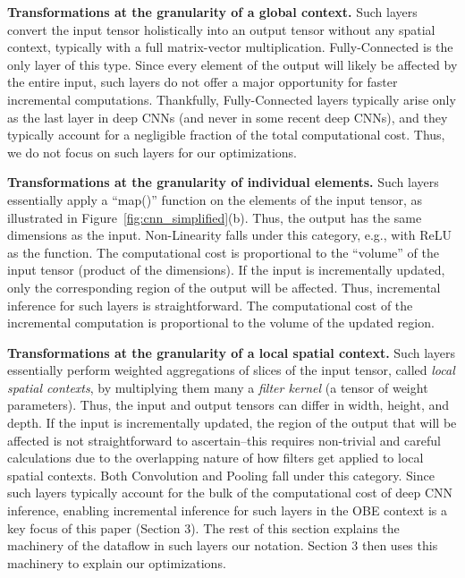 \vspace{2mm}
\noindent \textbf{Transformations at the granularity of a global context.} 
Such layers convert the input tensor holistically into an output tensor without any spatial context, typically with a full matrix-vector multiplication.
Fully-Connected is the only layer of this type. Since every element of the output will likely be affected by the entire input, such layers do not offer a major opportunity for faster incremental computations. Thankfully, Fully-Connected layers typically arise only as the last layer in deep CNNs (and never in some recent deep CNNs), and they typically account for a negligible fraction of the total computational cost. Thus, we do not focus on such layers for our optimizations.

\vspace{2mm}
\noindent \textbf{Transformations at the granularity of individual elements.} 
Such layers essentially apply a ``map()'' function on the elements of the input tensor, as illustrated in Figure~\ref{fig:cnn_simplified}(b). 
Thus, the output has the same dimensions as the input. Non-Linearity falls under this category, e.g., with ReLU as the function. The computational cost is proportional to the ``volume'' of the input tensor (product of the dimensions). If the input is incrementally updated, only the corresponding region of the output will be affected. Thus, incremental inference for such layers is straightforward. The computational cost of the incremental computation is proportional to the volume of the updated region.

\vspace{2mm}
\noindent \textbf{Transformations at the granularity of a local spatial context.}
Such layers essentially perform weighted aggregations of slices of the input tensor, called \textit{local spatial contexts}, by multiplying them many a \textit{filter kernel} (a tensor of weight parameters). Thus, the input and output tensors can differ in width, height, and depth. If the input is incrementally updated, the region of the output that will be affected is not straightforward to ascertain--this requires non-trivial and careful calculations due to the overlapping nature of how filters get applied to local spatial contexts. Both Convolution and Pooling fall under this category. Since such layers typically account for the bulk of the computational cost of deep CNN inference, enabling incremental inference for such layers in the OBE context is a key focus of this paper (Section 3). The rest of this section explains the machinery of the dataflow in such layers our notation. Section 3 then uses this machinery to explain our optimizations.

